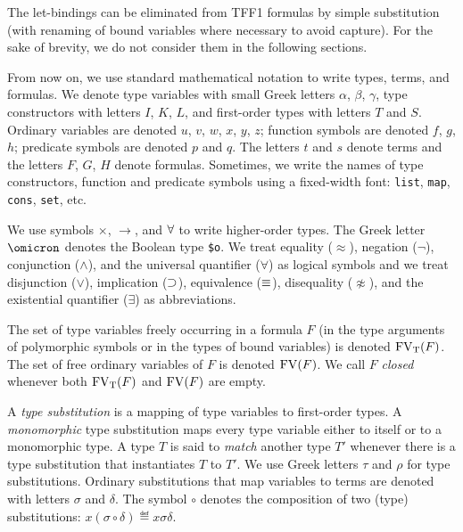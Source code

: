 The let-bindings can be eliminated from TFF1 formulas by simple
substitution (with renaming of bound variables where necessary
to avoid capture). For the sake of brevity, we do not consider
them in the following sections.

 From now on, we use standard
mathematical notation to write types, terms, and formulas.
We denote type variables with small Greek letters
$\alpha$, $\beta$, $\gamma$, type constructors
with letters $I$, $K$, $L$, and first-order
types with letters $T$ and $S$. Ordinary variables
are denoted $u$, $v$, $w$, $x$, $y$, $z$; function
symbols are denoted $f$, $g$, $h$; predicate symbols
are denoted $p$ and $q$. The letters $t$ and $s$ denote
terms and the letters $F$, $G$, $H$ denote formulas.
Sometimes, we write the names of type constructors,
function and predicate symbols using a fixed-width
font: {\tt list}, {\tt map}, {\tt cons}, {\tt set},
etc.

We use symbols ${\times}$, ${\to}$, and ${\forall}$
to write higher-order types. The Greek letter $\omicron$ denotes
the Boolean type {\tt \$o}. We treat equality ($\approx$),
negation ($\lnot$), conjunction ($\land$), and the universal
quantifier ($\forall$) as logical symbols and we treat
disjunction ($\lor$), implication ($\supset$), equivalence
($\equiv$), disequality ($\not\approx$), and the existential
quantifier ($\exists$) as abbreviations.

The set of type variables freely occurring in a formula $F$
(in the type arguments of polymorphic symbols or
in the types of bound variables) is denoted $\mathrm{FV}_\mathrm{T}(F)$.
The set of free ordinary variables of $F$
is denoted $\mathrm{FV}(F)$. We call $F$ {\em closed\/}
whenever both $\mathrm{FV}_\mathrm{T}(F)$ and $\mathrm{FV}(F)$ are empty.

A {\em type substitution\/} is a mapping of type variables
to first-order types. A {\em monomorphic\/} type substitution
maps every type variable either to itself or to a monomorphic type.
%
A type $T$ is said to {\em match\/} another type $T'$ whenever
there is a type substitution that instantiates $T$ to $T'$.
We use Greek letters $\tau$ and $\rho$ for type substitutions.
%
Ordinary substitutions that map variables to terms
are denoted with letters $\sigma$ and $\delta$.
The symbol $\circ$ denotes the composition
of two (type) substitutions:
$x(\sigma \circ \delta) \eqdef x\sigma\delta$.

